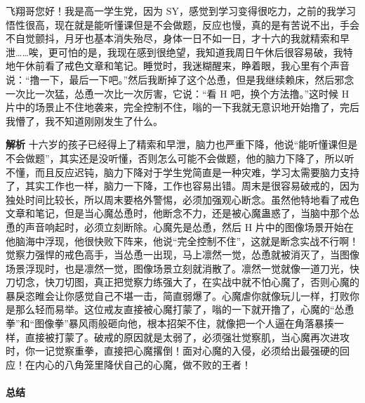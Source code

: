 \begin{case}
    飞翔哥您好！我是高一学生党，因为 SY，感觉到学习变得很吃力，之前的我学习悟性很高，现在就是能听懂课但是不会做题，反应也慢，真的是有苦说不出，手会不自觉颤抖，月牙也基本消失殆尽，身体一日不如一日，才十六的我就精索和早泄……唉，更可怕的是，我现在感到很绝望，我知道我周日午休后很容易破，我特地午休前看了戒色文章和笔记。睡觉时，我迷糊醒来，睁着眼，我心里有个声音说：“撸一下，最后一下吧。”然后我断掉了这个怂恿，但是我继续赖床，然后邪念一次比一次猛，怂恿一次比一次厉害，它说：“看 H 吧，换个方法撸。”这时候 H 片中的场景止不住地袭来，完全控制不住，嗡的一下我就无意识地开始撸了，完后我懵了，我不知道刚刚发生了什么。

    \textbf{解析} 十六岁的孩子已经得上了精索和早泄，脑力也严重下降，他说“能听懂课但是不会做题”，其实还是没听懂，否则怎么可能不会做题，他的脑力下降了，所以听不懂，而且反应迟钝，脑力下降对于学生党简直是一种灾难，学习太需要脑力支持了，其实工作也一样，脑力一下降，工作也容易出错。周末是很容易破戒的，因为独处时间比较长，所以周末要格外警惕，必须加强观心断念。虽然他特地看了戒色文章和笔记，但是当心魔怂恿时，他断念不力，还是被心魔蛊惑了，当脑中那个怂恿的声音响起时，必须立刻断除。心魔先是怂恿，然后 H 片中的图像场景开始在他脑海中浮现，他很快败下阵来，他说“完全控制不住”，这就是断念实战不行啊！觉察力强悍的戒色高手，当怂恿一出现，马上凛然一觉，怂恿就被消灭了，当图像场景浮现时，也是凛然一觉，图像场景立刻就消散了。凛然一觉就像一道刀光，快刀切念，快刀切图，真正把觉察力练强大了，在实战中就不怕心魔了，否则心魔的暴戾恣睢会让你感觉自己不堪一击，简直弱爆了。心魔虐你就像玩儿一样，打败你是那么轻而易举。这位戒友直接被心魔打蒙了，嗡的一下就开撸了，心魔的“怂恿拳”和“图像拳”暴风雨般砸向他，根本招架不住，就像把一个人逼在角落暴揍一样，直接被打蒙了。破戒的原因就是太弱了，必须强壮觉察肌，当心魔再次进攻时，你一记觉察重拳，直接把心魔撂倒！面对心魔的入侵，必须给出最强硬的回应！在内心的八角笼里降伏自己的心魔，做不败的王者！
\end{case}

\paragraph*{总结}

